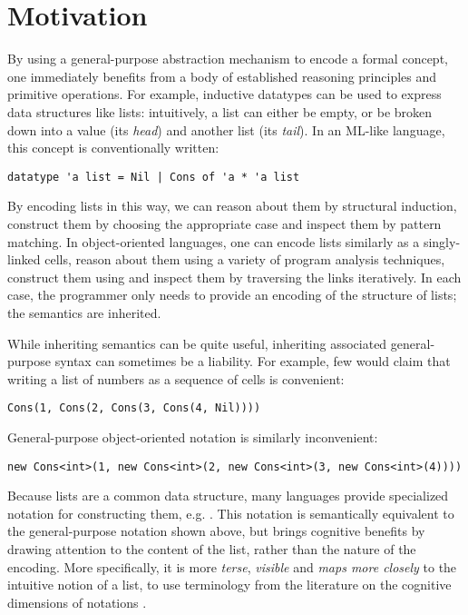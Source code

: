 \section{Motivation}
\label{s:intro}
By using a general-purpose abstraction mechanism to encode a formal concept, one immediately benefits from a body of established reasoning principles and primitive operations. For example, inductive datatypes can be used to express data structures like lists: intuitively, a list can either be empty, or be broken down into a value (its \emph{head}) and another list (its \emph{tail}). In an ML-like language, this concept is conventionally written:
\begin{lstlisting}
datatype 'a list = Nil | Cons of 'a * 'a list
\end{lstlisting}
By encoding lists in this way, we can reason about them by structural induction, construct them by choosing the appropriate case and inspect them by pattern matching. In object-oriented languages, one can encode lists similarly as a singly-linked cells, reason about them using a variety of program analysis techniques, construct them using  and inspect them by traversing the links iteratively. In each case, the programmer only needs to provide an encoding of the structure of lists; the semantics are inherited.

While inheriting semantics can be quite useful, inheriting associated general-purpose syntax can sometimes be a liability. For example, few would claim that writing a list of numbers as a sequence of  cells is convenient:
\begin{lstlisting}
Cons(1, Cons(2, Cons(3, Cons(4, Nil))))
\end{lstlisting}
General-purpose object-oriented notation is similarly inconvenient:
\begin{lstlisting}
new Cons<int>(1, new Cons<int>(2, new Cons<int>(3, new Cons<int>(4))))
\end{lstlisting}
Because lists are a common data structure, many languages provide specialized notation for constructing them, e.g. \li{[1, 2, 3, 4]}. This notation is semantically equivalent to the general-purpose notation shown above, but brings cognitive benefits by drawing attention to the content of the list, rather than the nature of the encoding. More specifically, it is more \emph{terse}, \emph{visible} and \emph{maps more closely} to the intuitive notion of a list, to use terminology from the literature on the cognitive dimensions of notations \cite{green}.

